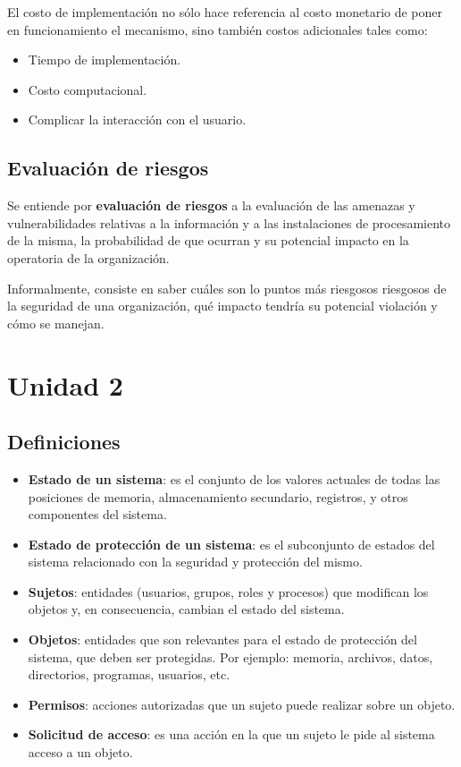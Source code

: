 \documentclass[]{article}
\begin{document}
El costo de implementación no sólo hace referencia al costo monetario de poner en funcionamiento el mecanismo, sino también costos adicionales tales como:
\begin{itemize}
	\item Tiempo de implementación.
	\item Costo computacional.
	\item Complicar la interacción con el usuario.
\end{itemize}

\subsection{Evaluación de riesgos}
Se entiende por \textbf{evaluación de riesgos} a la evaluación de las amenazas y vulnerabilidades relativas a la información y a las instalaciones de procesamiento de la misma, la probabilidad de que ocurran y su potencial impacto en la operatoria de la organización.

Informalmente, consiste en saber cuáles son lo puntos más riesgosos riesgosos de la seguridad de una organización, qué impacto tendría su potencial violación y cómo se manejan.


\newpage

\section{Unidad 2}
\subsection{Definiciones}
\begin{itemize}
	\item \textbf{Estado de un sistema}: es el conjunto de los valores actuales de todas las posiciones de memoria, almacenamiento secundario, registros, y otros componentes del sistema.
	\item \textbf{Estado de protección de un sistema}: es el subconjunto de estados del sistema relacionado con la seguridad y protección del mismo.
	\item \textbf{Sujetos}: entidades (usuarios, grupos, roles y procesos) que modifican los objetos y, en consecuencia, cambian el estado del sistema.
	\item \textbf{Objetos}: entidades que son relevantes para el estado de protección del sistema, que deben ser protegidas. Por ejemplo: memoria, archivos, datos, directorios, programas, usuarios, etc.
	\item \textbf{Permisos}: acciones autorizadas que un sujeto puede realizar sobre un objeto.
	\item \textbf{Solicitud de acceso}: es una acción en la que un sujeto le pide al sistema acceso a un objeto.
\end{itemize}
\end{document}
